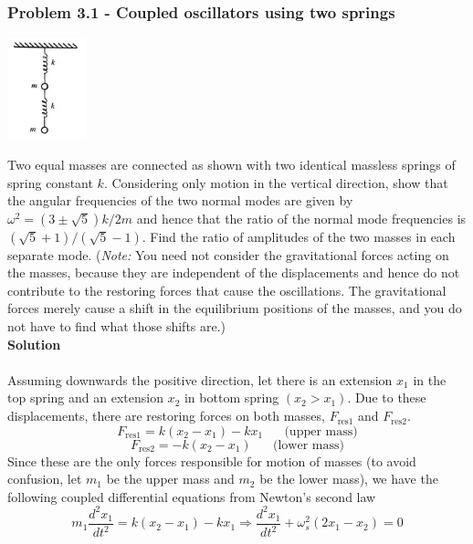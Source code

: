 \documentclass[12pt,a4paper]{article}
\begin{document}
\subsubsection*{Problem 3.1 - Coupled oscillators using two springs}
\begin{floatingfigure}[r]{0.2\textwidth}
\vspace{-0.8em} %
\centering
\includegraphics[width=0.17\textwidth]{figs/fig_prob_3.1.png}
\end{floatingfigure}
Two equal masses are connected as shown with two identical massless
springs of spring constant $k$. Considering only motion in the vertical direction, show that the angular frequencies of the two normal modes are given by $\omega^2=(3\pm\sqrt{5})k/2m$ and hence that the ratio of the normal mode frequencies is $(\sqrt{5}+1)/(\sqrt{5}-1)$. Find the ratio of amplitudes of the two masses in each separate mode. (\textit{Note:} You need not consider the gravitational forces acting on the masses, because they are independent of the displacements and hence do not contribute to the restoring forces that cause the oscillations. The gravitational forces merely cause a shift in the equilibrium positions of the masses, and you do not have to find what those shifts are.)
\newline
\\
\textbf{Solution}
\\
\\Assuming downwards the positive direction, let there is an extension $x_1$ in the top spring and an extension $x_2$ in bottom spring $(x_2>x_1)$. Due to these displacements, there are restoring forces on both masses, $F_{\text{res1}}$ and $F_{\text{res2}}$.
\[F_{\text{res1}}=k(x_2-x_1)-kx_1\,\,\,\,\,\,\,\,\,\,\text{(upper mass)}\]
\[F_{\text{res2}}=-k(x_2-x_1)\,\,\,\,\,\,\,\,\,\,\text{(lower mass)}\]
Since these are the only forces responsible for motion of masses (to avoid confusion, let $m_1$ be the upper mass and $m_2$ be the lower mass), we have the following coupled differential equations from Newton's second law
\begin{equation}
    m_1\frac{d^2x_1}{dt^2}=k(x_2-x_1)-kx_1\Rightarrow\frac{d^2x_1}{dt^2}+\omega_s^2(2x_1-x_2)=0
\end{equation}
\end{document}
